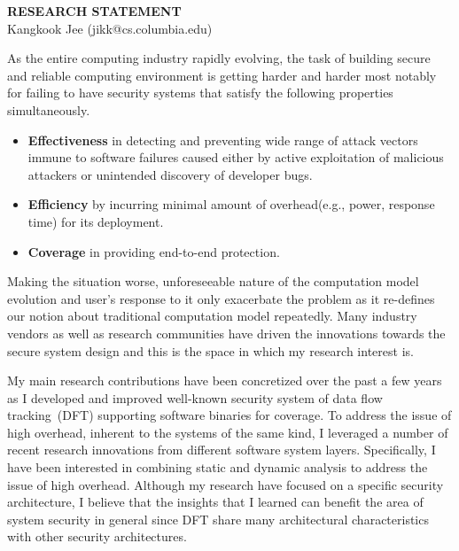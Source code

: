 \documentclass[letterpaper, 10pt]{article}
\begin{document}
\begin{small}

\begin{center}
{\LARGE \bf RESEARCH STATEMENT}\\
\vspace*{0.1cm}
{\normalsize Kangkook Jee (jikk@cs.columbia.edu)}
\end{center}



As the entire computing industry rapidly evolving, the task of building secure
and  reliable computing environment is getting harder and harder most notably
for failing to have security systems that satisfy the following properties
simultaneously.

\begin{itemize}

        \item {\bf Effectiveness} in detecting and preventing wide range of
                attack vectors immune to software failures caused either by
                active exploitation of malicious attackers or unintended
                discovery of developer bugs.

        \item {\bf Efficiency} by incurring minimal amount of overhead(e.g.,
                power, response time) for its deployment.

        \item {\bf Coverage} in providing end-to-end protection.  

\end{itemize}

Making the situation worse, unforeseeable nature of the computation model
evolution and user's response to it only exacerbate the problem as it re-defines
our notion about traditional computation model repeatedly.
%
Many industry vendors as well as research communities have driven the
innovations towards the secure system design and this is the space in which my
research interest is.

My main research contributions have been concretized over the past a few years
as I developed and improved well-known security system of data flow
tracking~(DFT) supporting software binaries for coverage.
%
To address the issue of high overhead, inherent to the systems of the same
kind, I leveraged a number of recent research innovations from different
software system layers. Specifically, I have been interested in combining
static and dynamic analysis to address the issue of high overhead.
%
Although my research have focused on a specific security architecture, I
believe that the insights that I learned can benefit the area of system
security in general since DFT share many architectural characteristics with
other security architectures.


\end{small}
\end{document}
